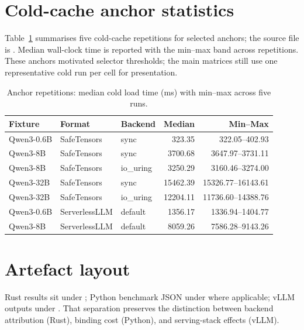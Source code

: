 \section{Cold-cache anchor statistics}
\label{app:anchor-stats}

Table~\ref{tab:anchor-summary} summarises five cold-cache repetitions for selected anchors; the source file is . Median wall-clock time is reported with the min--max band across repetitions. These anchors motivated selector thresholds; the main matrices still use one representative cold run per cell for presentation.

\begin{table}[htbp]
\centering
\small
\caption{Anchor repetitions: median cold load time (ms) with min--max across five runs.}
\label{tab:anchor-summary}
\begin{tabular}{lllrr}
\toprule
Fixture & Format & Backend & Median & Min--Max \\
\midrule
Qwen3-0.6B & SafeTensors & sync & 323.35 & 322.05--402.93 \\
Qwen3-8B & SafeTensors & sync & 3700.68 & 3647.97--3731.11 \\
Qwen3-8B & SafeTensors & io\_uring & 3250.29 & 3160.46--3274.00 \\
Qwen3-32B & SafeTensors & sync & 15462.39 & 15326.77--16143.61 \\
Qwen3-32B & SafeTensors & io\_uring & 12204.11 & 11736.60--14388.76 \\
Qwen3-0.6B & ServerlessLLM & default & 1356.17 & 1336.94--1404.77 \\
Qwen3-8B & ServerlessLLM & default & 8059.26 & 7586.28--9143.26 \\
\bottomrule
\end{tabular}
\end{table}

\section{Artefact layout}
\label{app:artefact-layout}

Rust results sit under ; Python benchmark JSON under  where applicable; vLLM outputs under . That separation preserves the distinction between backend attribution (Rust), binding cost (Python), and serving-stack effects (vLLM).
